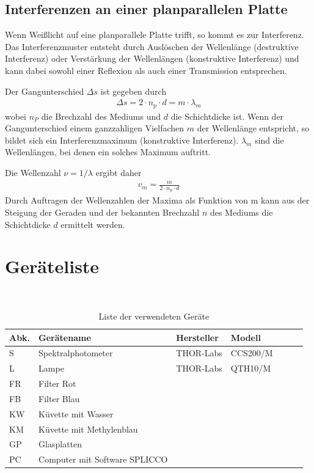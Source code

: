 \documentclass{article}
\begin{document}
\subsection{Interferenzen an einer planparallelen Platte}


Wenn Weißlicht auf eine planparallele Platte trifft, so kommt es zur Interferenz. Das Interferenzmuster entsteht durch Auslöschen der Wellenlänge (destruktive Interferenz) oder Verstärkung der Wellenlängen (konstruktive Interferenz) und kann dabei sowohl einer Reflexion als auch einer Transmission entsprechen.

Der Gangunterschied $\Delta s$ ist  gegeben durch
\begin{align}
\label{eq:gangunterschied}
\Delta s  = 2\cdot n_p\cdot d = m\cdot\lambda_m
\end{align}
wobei $n_P$ die Brechzahl des Mediums und $d$ die Schichtdicke ist. Wenn der Gangunterschied einem ganzzahligen Vielfachen $m$ der Wellenlänge entspricht, so bildet sich ein Interferenzmaximum (konstruktive Interferenz). $\lambda_m$ sind die Wellenlängen, bei denen ein solches Maximum auftritt.

Die Wellenzahl $\nu = 1/\lambda$ ergibt daher
\begin{align}
v_m = \frac{m}{2\cdot n_p\cdot d}
\end{align}
Durch Auftragen der Wellenzahlen der Maxima als Funktion von m kann aus der Steigung der Geraden und der bekannten Brechzahl $n$ des Mediums die Schichtdicke $d$ ermittelt werden.





\section{Geräteliste}

\begin{table}[H]
\caption{Liste der verwendeten Geräte}

~

\begin{tabular}{l|p{3cm}p{3.5cm}llll}
Abk. & Gerätename    & Hersteller & Modell  \\
\hline
S & Spektralphotometer & THOR-Labs & CCS200/M \\
L & Lampe & THOR-Labs & QTH10/M \\
FR & Filter Rot & \\
FB & Filter Blau & \\
KW & Küvette mit Wasser &\\
KM & Küvette mit Methylenblau \\
GP & Glasplatten \\
PC & Computer mit Software SPLICCO
\end{tabular}
\end{table}
\end{document}
